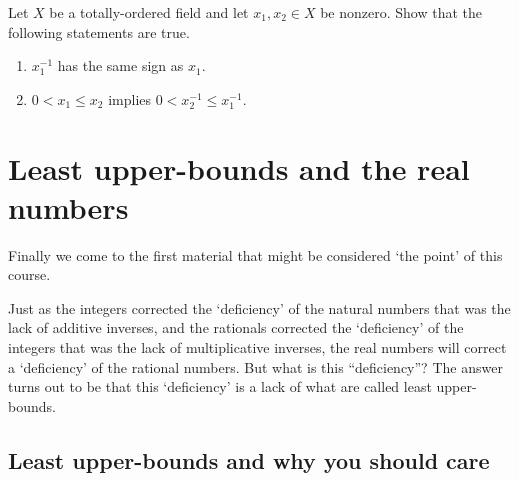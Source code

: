 \begin{exr}{}{}
Let $X$ be a totally-ordered field and let $x_1,x_2\in X$ be nonzero.  Show that the following statements are true.
\begin{enumerate}
\item $x_1^{-1}$ has the same sign as $x_1$.
\item $0<x_1\leq x_2$ implies $0<x_2^{-1}\leq x_1^{-1}$.
\end{enumerate}
\end{exr}

\section{Least upper-bounds and the real numbers}

Finally we come to the first material that might be considered `the point' of this course.

Just as the integers corrected the `deficiency' of the natural numbers that was the lack of additive inverses, and the rationals corrected the `deficiency' of the integers that was the lack of multiplicative inverses, the real numbers will correct a `deficiency' of the rational numbers.  But what is this ``deficiency''?  The answer turns out to be that this `deficiency' is a lack of what are called least upper-bounds.

\subsection{Least upper-bounds and why you should care}

